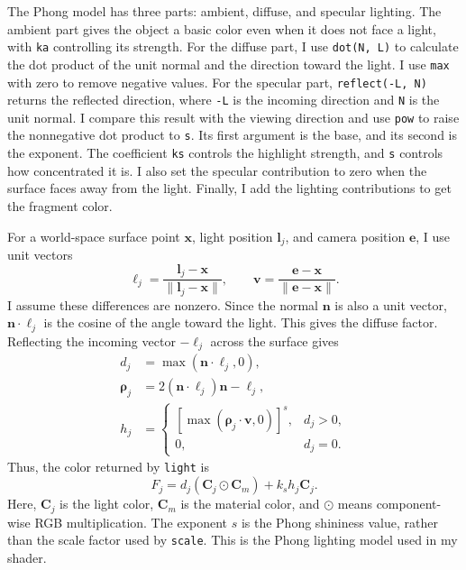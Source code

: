 \documentclass[acmtog]{acmart}
\begin{document}
The Phong model has three parts: ambient, diffuse, and specular lighting. The ambient part gives the object a basic color even when it does not face a light, with \texttt{ka} controlling its strength. For the diffuse part, I use \texttt{dot(N, L)} to calculate the dot product of the unit normal and the direction toward the light. I use \texttt{max} with zero to remove negative values. For the specular part, \texttt{reflect(-L, N)} returns the reflected direction, where \texttt{-L} is the incoming direction and \texttt{N} is the unit normal. I compare this result with the viewing direction and use \texttt{pow} to raise the nonnegative dot product to \texttt{s}. Its first argument is the base, and its second is the exponent. The coefficient \texttt{ks} controls the highlight strength, and \texttt{s} controls how concentrated it is. I also set the specular contribution to zero when the surface faces away from the light. Finally, I add the lighting contributions to get the fragment color.

For a world-space surface point $\mathbf x$, light position $\mathbf l_j$, and camera position $\mathbf e$, I use unit vectors
\begin{equation}
\boldsymbol\ell_j=\frac{\mathbf l_j-\mathbf x}{\|\mathbf l_j-\mathbf x\|},
\qquad
\mathbf v=\frac{\mathbf e-\mathbf x}{\|\mathbf e-\mathbf x\|}.
\end{equation}
I assume these differences are nonzero. Since the normal $\mathbf n$ is also a unit vector, $\mathbf n\cdot\boldsymbol\ell_j$ is the cosine of the angle toward the light. This gives the diffuse factor. Reflecting the incoming vector $-\boldsymbol\ell_j$ across the surface gives
\begin{equation}
\begin{aligned}
d_j&=\max(\mathbf n\cdot\boldsymbol\ell_j,0),\\
\boldsymbol\rho_j&=2(\mathbf n\cdot\boldsymbol\ell_j)\mathbf n-\boldsymbol\ell_j,\\
h_j&=
\begin{cases}
[\max(\boldsymbol\rho_j\cdot\mathbf v,0)]^s,&d_j>0,\\
0,&d_j=0.
\end{cases}
\end{aligned}
\end{equation}
Thus, the color returned by \texttt{light} is
\begin{equation}
F_j=d_j(\mathbf C_j\odot\mathbf C_m)+k_s h_j\mathbf C_j.
\end{equation}
Here, $\mathbf C_j$ is the light color, $\mathbf C_m$ is the material color, and $\odot$ means component-wise RGB multiplication. The exponent $s$ is the Phong shininess value, rather than the scale factor used by \texttt{scale}. This is the Phong lighting model used in my shader.
\end{document}
